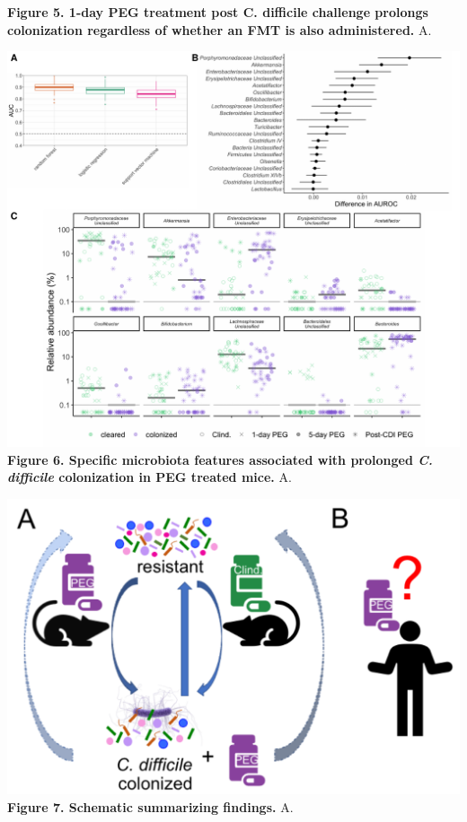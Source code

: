 \documentclass[
  11pt,
]{article}
\begin{document}
\textbf{Figure 5. 1-day PEG treatment post C. difficile challenge
prolongs colonization regardless of whether an FMT is also
administered.} A. \newpage

\includegraphics{figure_6.pdf} \textbf{Figure 6. Specific microbiota
features associated with prolonged \emph{C. difficile} colonization in
PEG treated mice.} A. \newpage

\includegraphics{figure_7.pdf} \textbf{Figure 7. Schematic summarizing
findings.} A. \newpage
\end{document}
